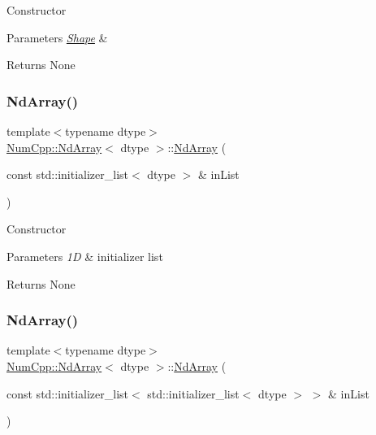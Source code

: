Constructor


\begin{DoxyParams}{Parameters}
{\em \mbox{\hyperlink{class_num_cpp_1_1_shape}{Shape}}} & \\
\hline
\end{DoxyParams}
\begin{DoxyReturn}{Returns}
None 
\end{DoxyReturn}
\mbox{\label{class_num_cpp_1_1_nd_array_a71fdbc36c3eaee08493eb63ee58690d2}} 
\subsubsection{\texorpdfstring{Nd\+Array()}{NdArray()}\hspace{0.1cm}{\footnotesize\ttfamily [5/12]}}
{\footnotesize\ttfamily template$<$typename dtype$>$ \\
\mbox{\hyperlink{class_num_cpp_1_1_nd_array}{Num\+Cpp\+::\+Nd\+Array}}$<$ dtype $>$\+::\mbox{\hyperlink{class_num_cpp_1_1_nd_array}{Nd\+Array}} (\begin{DoxyParamCaption}\item[{const std\+::initializer\+\_\+list$<$ dtype $>$ \&}]{in\+List }\end{DoxyParamCaption})\hspace{0.3cm}{\ttfamily [inline]}}

Constructor


\begin{DoxyParams}{Parameters}
{\em 1D} & initializer list \\
\hline
\end{DoxyParams}
\begin{DoxyReturn}{Returns}
None 
\end{DoxyReturn}
\mbox{\label{class_num_cpp_1_1_nd_array_ad70efcdefcd50d8189f425a0e2b6abcd}} 
\subsubsection{\texorpdfstring{Nd\+Array()}{NdArray()}\hspace{0.1cm}{\footnotesize\ttfamily [6/12]}}
{\footnotesize\ttfamily template$<$typename dtype$>$ \\
\mbox{\hyperlink{class_num_cpp_1_1_nd_array}{Num\+Cpp\+::\+Nd\+Array}}$<$ dtype $>$\+::\mbox{\hyperlink{class_num_cpp_1_1_nd_array}{Nd\+Array}} (\begin{DoxyParamCaption}\item[{const std\+::initializer\+\_\+list$<$ std\+::initializer\+\_\+list$<$ dtype $>$ $>$ \&}]{in\+List }\end{DoxyParamCaption})\hspace{0.3cm}{\ttfamily [inline]}}


